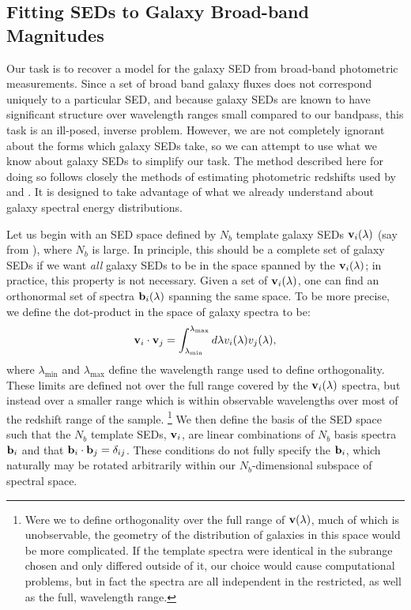 \documentclass[10pt,preprint]{aastex}
\newcommand{\vv}[1]{{\bf #1}}
\begin{document}
\subsection{Fitting SEDs to Galaxy Broad-band Magnitudes}

Our task is to recover a model for the galaxy SED from broad-band
photometric measurements. Since a set of broad band galaxy fluxes does
not correspond uniquely to a particular SED, and because galaxy SEDs
are known to have significant structure over wavelength ranges small
compared to our bandpass, this task is an ill-posed, inverse
problem. However, we are not completely ignorant about the forms which
galaxy SEDs take, so we can attempt to use what we know about galaxy
SEDs to simplify our task.  The method described here for doing so
follows closely the methods of estimating photometric redshifts used
by \citet{csabai00a} and \citet{budavari00a}. It is designed to take
advantage of what we already understand about galaxy spectral energy
distributions.

Let us begin with an SED space defined by $N_b$ template galaxy SEDs
$\vv{v}_i(\lambda)$ (say from \citealt{bruzual93a}), where $N_b$ is
large. In principle, this should be a complete set of galaxy SEDs if
we want {\it all} galaxy SEDs to be in the space spanned by the
$\vv{v}_i(\lambda)$; in practice, this property is not necessary.
Given a set of $\vv{v}_i(\lambda)$, one can find an orthonormal set of
spectra $\vv{b}_i(\lambda)$ spanning the same space.  To be more
precise, we define the dot-product in the space of galaxy spectra to
be:
\begin{equation}
\vv{v}_i \cdot \vv{v}_j =
\int_{\lambda_{\mathrm{min}}}^{\lambda_{\mathrm{max}}} d\lambda
v_i(\lambda) v_j(\lambda),
\end{equation}
where $\lambda_{\mathrm{min}}$ and $\lambda_{\mathrm{max}}$ define the
wavelength range used to define orthogonality. These limits are
defined not over the full range covered by the $\vv{v}_i(\lambda)$
spectra, but instead over a smaller range which is within observable
wavelengths over most of the redshift range of the
sample. \footnote{Were we to define orthogonality over the full range
of $\vv{v}(\lambda)$, much of which is unobservable, the geometry of
the distribution of galaxies in this space would be more complicated.
If the template spectra were identical in the subrange chosen and only
differed outside of it, our choice would cause computational
problems, but in fact the spectra are all independent in the
restricted, as well as the full, wavelength range.}  We then define
the basis of the SED space such that the $N_b$ template SEDs,
$\vv{v}_i$, are linear combinations of $N_b$ basis spectra $\vv{b}_i$
and that $\vv{b}_i \cdot \vv{b}_j = \delta_{ij}$. These conditions do
not fully specify the $\vv{b}_i$, which naturally may be rotated
arbitrarily within our $N_b$-dimensional subspace of spectral space.
\end{document}
